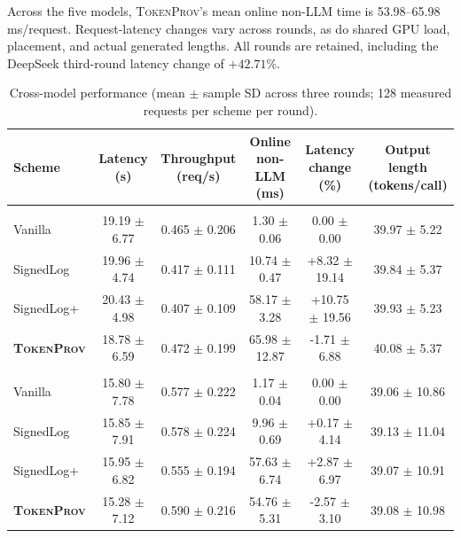 Across the five models, \textsc{TokenProv}'s mean online non-LLM time is
53.98--65.98\,ms/request. Request-latency changes vary across rounds, as do shared
GPU load, placement, and actual generated lengths. All rounds are retained,
including the DeepSeek third-round latency change of $+42.71\%$.
\begin{table}[!t]
\centering
\caption{Cross-model performance (mean $\pm$ sample SD across three rounds; 128 measured requests per scheme per round).}
\label{tab:b4-cross-model}
\footnotesize
\renewcommand{\arraystretch}{1.10}
\begin{tabular*}{\textwidth}{@{\hspace{4pt}}l@{\extracolsep{\fill}}ccccc@{\hspace{4pt}}}
\toprule
\textbf{Scheme} & \shortstack{\textbf{Latency}\\\textbf{(s)}} & \shortstack{\textbf{Throughput}\\\textbf{(req/s)}} & \shortstack{\textbf{Online non-LLM}\\\textbf{(ms)}} & \shortstack{\textbf{Latency change}\\\textbf{(\%)}} & \shortstack{\textbf{Output length}\\\textbf{(tokens/call)}} \\
\midrule
\rowcolor{gray!12}
\multicolumn{6}{l}{\textbf{Qwen3-1.7B}} \\
Vanilla & 19.19 $\pm$ 6.77 & 0.465 $\pm$ 0.206 & 1.30 $\pm$ 0.06 & 0.00 $\pm$ 0.00 & 39.97 $\pm$ 5.22 \\
SignedLog & 19.96 $\pm$ 4.74 & 0.417 $\pm$ 0.111 & 10.74 $\pm$ 0.47 & +8.32 $\pm$ 19.14 & 39.84 $\pm$ 5.37 \\
SignedLog+ & 20.43 $\pm$ 4.98 & 0.407 $\pm$ 0.109 & 58.17 $\pm$ 3.28 & +10.75 $\pm$ 19.56 & 39.93 $\pm$ 5.23 \\
\textbf{\textsc{TokenProv}} & 18.78 $\pm$ 6.59 & 0.472 $\pm$ 0.199 & 65.98 $\pm$ 12.87 & -1.71 $\pm$ 6.88 & 40.08 $\pm$ 5.37 \\
\midrule
\rowcolor{gray!12}
\multicolumn{6}{l}{\textbf{Qwen3-4B}} \\
Vanilla & 15.80 $\pm$ 7.78 & 0.577 $\pm$ 0.222 & 1.17 $\pm$ 0.04 & 0.00 $\pm$ 0.00 & 39.06 $\pm$ 10.86 \\
SignedLog & 15.85 $\pm$ 7.91 & 0.578 $\pm$ 0.224 & 9.96 $\pm$ 0.69 & +0.17 $\pm$ 4.14 & 39.13 $\pm$ 11.04 \\
SignedLog+ & 15.95 $\pm$ 6.82 & 0.555 $\pm$ 0.194 & 57.63 $\pm$ 6.74 & +2.87 $\pm$ 6.97 & 39.07 $\pm$ 10.91 \\
\textbf{\textsc{TokenProv}} & 15.28 $\pm$ 7.12 & 0.590 $\pm$ 0.216 & 54.76 $\pm$ 5.31 & -2.57 $\pm$ 3.10 & 39.08 $\pm$ 10.98 \\

\end{tabular*}
\end{table}
